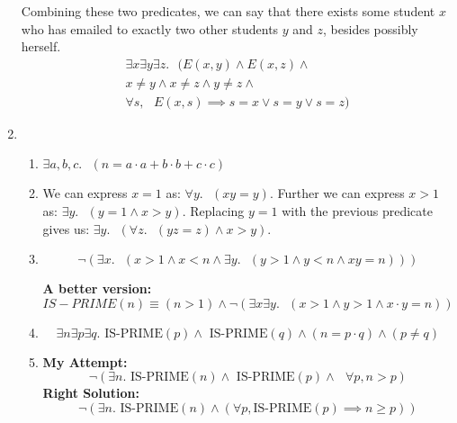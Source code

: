 \documentclass[11pt]{article}
\begin{document}
\begin{enumerate}
  Combining these two predicates, we can say that there exists some
  student $x$ who has emailed to exactly two other students $y$ and
  $z$, besides possibly herself.
  \begin{align}
    \exists{x}\exists{y}\exists{z}. \text{  } (E(x,y) \land E(x,z)
    \land \\ x \neq y \land x \neq z \land y \neq z \land \\
    \forall{s}, \text{ } E(x,s) \implies s = x \lor s = y \lor s = z)
  \end{align}

\item %
  \begin{enumerate}
  \item
    $\exists{a,b,c}. \text{ } (n = a \cdot a + b \cdot b + c \cdot c)$
  \item 
    We can express $x=1$ as: $\forall{y}. \text{ }(xy=y)$. Further we
    can express $x>1$ as: $\exists{y}. \text{ } (y=1 \land
    x>y)$. Replacing $y=1$ with the previous predicate gives us:
    $\exists{y}. \text{ } (\forall{z}. \text{ }(yz=z) \land x>y)$.
  \item 
    \begin{equation}
      \lnot(\exists{x}. \text{ }(x>1 \land x<n \land
      \exists{y}. \text{ } (y>1 \land y<n \land xy=n)))
    \end{equation}

    \textbf{A better version:}\\
    \begin{equation}
      IS-PRIME(n) \equiv (n > 1) \land 
      \lnot(\exists{x}\exists{y}. \text{ }(x>1 \land y>1 \land x \cdot
      y=n))
    \end{equation}
    
  \item
    \begin{equation}
      \exists{n}\exists{p}\exists{q}. \text{ IS-PRIME}(p) \land
      \text{ IS-PRIME}(q) \land (n = p \cdot q) \land (p \neq q)
    \end{equation}

  \item
    \textbf{My Attempt:}\\
    \begin{equation}
      \lnot(\exists{n}. \text{ IS-PRIME}(n) \land \text{ IS-PRIME}(p)
      \land \text{ }\forall{p}, n > p) 
    \end{equation}
    \textbf{Right Solution:}\\
    \begin{equation}
      \lnot(\exists{n}. \text{ IS-PRIME}(n) \land (\forall{p}, \text{
        IS-PRIME}(p) \implies n \geq p))
    \end{equation}


\end{enumerate}
\end{enumerate}
\end{document}
